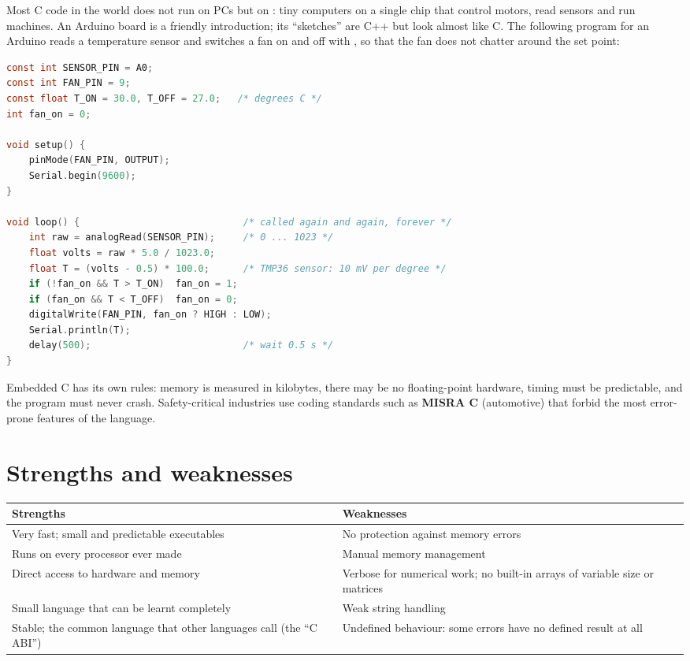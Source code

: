 Most C code in the world does not run on PCs but on : tiny
computers on a single chip that control motors, read sensors and run machines. An Arduino
board is a friendly introduction; its ``sketches'' are C++ but look almost like C. The
following program for an Arduino reads a temperature sensor and switches a fan on and off
with , so that the fan does not chatter around the set point:
\begin{lstlisting}[language=C]
const int SENSOR_PIN = A0;
const int FAN_PIN = 9;
const float T_ON = 30.0, T_OFF = 27.0;   /* degrees C */
int fan_on = 0;

void setup() {
    pinMode(FAN_PIN, OUTPUT);
    Serial.begin(9600);
}

void loop() {                             /* called again and again, forever */
    int raw = analogRead(SENSOR_PIN);     /* 0 ... 1023 */
    float volts = raw * 5.0 / 1023.0;
    float T = (volts - 0.5) * 100.0;      /* TMP36 sensor: 10 mV per degree */
    if (!fan_on && T > T_ON)  fan_on = 1;
    if (fan_on && T < T_OFF)  fan_on = 0;
    digitalWrite(FAN_PIN, fan_on ? HIGH : LOW);
    Serial.println(T);
    delay(500);                           /* wait 0.5 s */
}
\end{lstlisting}
Embedded C has its own rules: memory is measured in kilobytes, there may be no
floating-point hardware, timing must be predictable, and the program must never crash.
Safety-critical industries use coding standards such as \textbf{MISRA C} (automotive) that
forbid the most error-prone features of the language.

\section{Strengths and weaknesses}

\begin{center}
\small
\begin{tabularx}{\linewidth}{@{}>{\raggedright\arraybackslash}X>{\raggedright\arraybackslash}X@{}}
\toprule
\textbf{Strengths} & \textbf{Weaknesses}\\
\midrule
Very fast; small and predictable executables & No protection against memory errors\\
Runs on every processor ever made & Manual memory management\\
Direct access to hardware and memory & Verbose for numerical work; no built-in arrays of variable size or matrices\\
Small language that can be learnt completely & Weak string handling\\
Stable; the common language that other languages call (the ``C ABI'') & Undefined behaviour: some errors have no defined result at all\\
\bottomrule
\end{tabularx}
\end{center}

